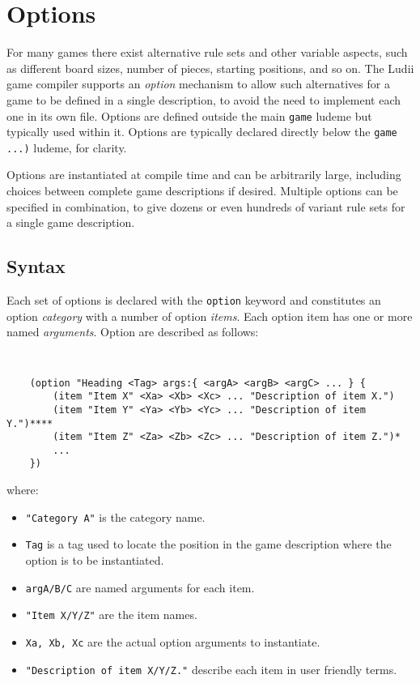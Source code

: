 \chapter{Options}  \label{Chapter:Options}

For many games there exist alternative rule sets and other variable aspects, such as different board sizes, number of pieces, starting positions, and so on. 
The Ludii game compiler supports an {\it option} mechanism to allow such alternatives for a game to be defined in a single description, to avoid the need to implement each one in its own file. 
Options are defined outside the main {\tt game} ludeme but typically used within it. 
Options are typically declared directly below the {\tt game ...)} ludeme, for clarity.

Options are instantiated at compile time and can be arbitrarily large, including choices between complete game descriptions if desired. 
Multiple options can be specified in combination, to give dozens or even hundreds of variant rule sets for a single game description.


\section{Syntax}

Each set of options is declared with the {\tt option} keyword and constitutes an option {\it category} with a number of option {\it items}. 
Each option item has one or more named {\it arguments}.  
Option are described as follows:

{\tt
\begin{verbatim}
    (option "Heading <Tag> args:{ <argA> <argB> <argC> ... } {
        (item "Item X" <Xa> <Xb> <Xc> ... "Description of item X.")  
        (item "Item Y" <Ya> <Yb> <Yc> ... "Description of item Y.")****   
        (item "Item Z" <Za> <Zb> <Zc> ... "Description of item Z.")*   
        ...
    })
\end{verbatim}
}

\noindent
where:
\begin{itemize}
\item {\tt "Category A"} is the category name.
\item {\tt Tag} is a tag used to locate the position in the game description where the option is to be instantiated.
\item {\tt argA/B/C} are named arguments for each item.
\item {\tt "Item X/Y/Z"} are the item names.
\item {\tt Xa, Xb, Xc} are the actual option arguments to instantiate.
\item {\tt "Description of item X/Y/Z."} describe each item in user friendly terms.
\end{itemize}

